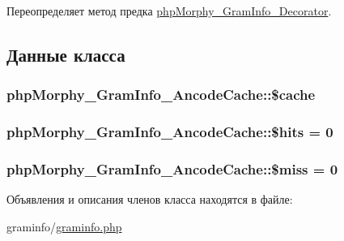 Переопределяет метод предка \hyperlink{classphpMorphy__GramInfo__Decorator_a64dc470014661163c986515947a5d7f0}{phpMorphy\_\-GramInfo\_\-Decorator}.



\subsection{Данные класса}
\hypertarget{classphpMorphy__GramInfo__AncodeCache_a20b69bfdd989661cbc20d088f6a51db1}{
\subsubsection[{\$cache}]{\setlength{\rightskip}{0pt plus 5cm}phpMorphy\_\-GramInfo\_\-AncodeCache::\$cache}}
\label{classphpMorphy__GramInfo__AncodeCache_a20b69bfdd989661cbc20d088f6a51db1}
\hypertarget{classphpMorphy__GramInfo__AncodeCache_a3aaf71ee909e5038c772bd33060b8990}{
\subsubsection[{\$hits}]{\setlength{\rightskip}{0pt plus 5cm}phpMorphy\_\-GramInfo\_\-AncodeCache::\$hits = 0}}
\label{classphpMorphy__GramInfo__AncodeCache_a3aaf71ee909e5038c772bd33060b8990}
\hypertarget{classphpMorphy__GramInfo__AncodeCache_abb4d480c8601212c7ff2ecfecf877e35}{
\subsubsection[{\$miss}]{\setlength{\rightskip}{0pt plus 5cm}phpMorphy\_\-GramInfo\_\-AncodeCache::\$miss = 0}}
\label{classphpMorphy__GramInfo__AncodeCache_abb4d480c8601212c7ff2ecfecf877e35}


Объявления и описания членов класса находятся в файле:\begin{DoxyCompactItemize}
\item 
graminfo/\hyperlink{graminfo_8php}{graminfo.php}\end{DoxyCompactItemize}
